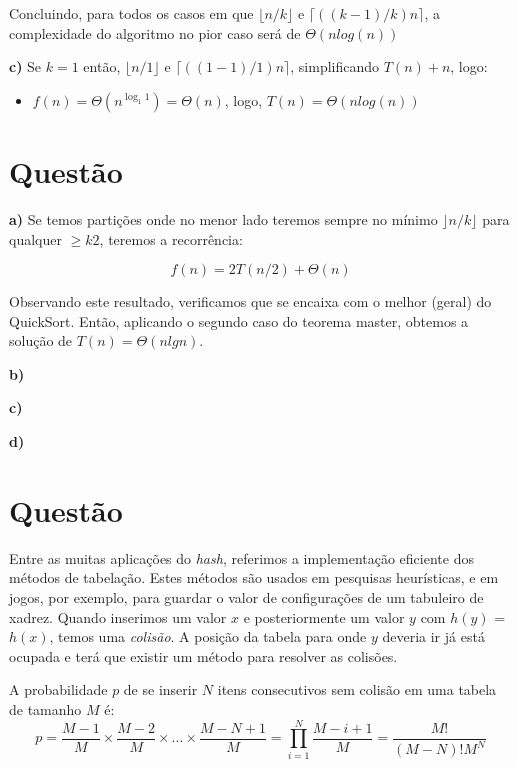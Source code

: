 \documentclass[a4paper,12pt]{article}
\begin{document}
\begin{description}
	Concluindo, para todos os casos em que $\lfloor n/k \rfloor$ e $\lceil ((k-1)/k)n \rceil$, a complexidade do algoritmo no pior caso será de $\Theta (n log(n))$ 

	\item{\textbf{c)}} Se $k=1$ então, $\lfloor n/1 \rfloor$ e $\lceil ((1-1)/1)n \rceil$, simplificando $T(n)+n$, logo:
	\begin{itemize}
		\item $f(n) = \Theta(n^{\log_1 1}) = \Theta(n)$, logo, $T(n) = \Theta(nlog(n))$
	\end{itemize}
\end{description}

\section{Questão}
\begin{description}
  \item{\textbf{a)}} Se temos partições onde no menor lado teremos sempre no mínimo $\rfloor n/k \rfloor$ para qualquer $\geq k 2$, teremos a recorrência:
  	
 $$f(n) = 2T(n/2) + \Theta(n)$$

 Observando este resultado, verificamos que se encaixa com o melhor (geral) do QuickSort. Então, aplicando o segundo caso do teorema master, obtemos a solução de $T(n) = \Theta(n lg n)$.

	\item{\textbf{b)}}
	\item{\textbf{c)}}
	\item{\textbf{d)}}
\end{description}

\section{Questão}
Entre as muitas aplicações do \textit{hash}, referimos a implementação eficiente dos métodos de tabelação. Estes métodos são usados em pesquisas heurísticas, e em jogos, por exemplo, para guardar o valor de configurações de um tabuleiro de xadrez.
Quando inserimos um valor $x$ e posteriormente um valor $y$ com $h(y)$ = $h(x)$, temos uma \textit{colisão}. A posição da tabela para onde $y$ deveria ir já está ocupada e terá que existir um método para resolver as colisões.

A probabilidade $p$ de se inserir $N$ itens consecutivos sem colisão em uma tabela de tamanho $M$ é:
	$$
	p = \frac{M-1}{M}\times\frac{M-2}{M}\times...\times\frac{M-N+1}{M} = \prod \limits_{i=1}^N \frac{M-i+1}{M} = \frac{M!}{(M-N)!M^N}
	$$
\end{document}
